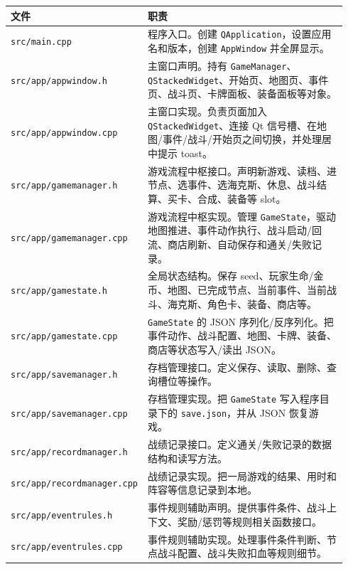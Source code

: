 \documentclass[UTF8,10pt]{ctexart}
\begin{document}
{\small
\begin{longtable}{p{0.34\linewidth}p{0.60\linewidth}}
\toprule
\textbf{文件} & \textbf{职责} \\
\midrule
\texttt{src/\allowbreak{}main.\allowbreak{}cpp} & 程序入口。创建 \texttt{QApplication}，设置应用名和版本，创建 \texttt{AppWindow} 并全屏显示。 \\
\texttt{src/\allowbreak{}app/\allowbreak{}appwindow.\allowbreak{}h} & 主窗口声明。持有 \texttt{GameManager}、\texttt{QStackedWidget}、开始页、地图页、事件页、战斗页、卡牌面板、装备面板等对象。 \\
\texttt{src/\allowbreak{}app/\allowbreak{}appwindow.\allowbreak{}cpp} & 主窗口实现。负责页面加入 \texttt{QStackedWidget}、连接 Qt 信号槽、在地图/事件/战斗/开始页之间切换，并处理居中提示 toast。 \\
\texttt{src/\allowbreak{}app/\allowbreak{}gamemanager.\allowbreak{}h} & 游戏流程中枢接口。声明新游戏、读档、进节点、选事件、选海克斯、休息、战斗结算、买卡、合成、装备等 slot。 \\
\texttt{src/\allowbreak{}app/\allowbreak{}gamemanager.\allowbreak{}cpp} & 游戏流程中枢实现。管理 \texttt{GameState}，驱动地图推进、事件动作执行、战斗启动/回流、商店刷新、自动保存和通关/失败记录。 \\
\texttt{src/\allowbreak{}app/\allowbreak{}gamestate.\allowbreak{}h} & 全局状态结构。保存 seed、玩家生命/金币、地图、已完成节点、当前事件、当前战斗、海克斯、角色卡、装备、商店等。 \\
\texttt{src/\allowbreak{}app/\allowbreak{}gamestate.\allowbreak{}cpp} & \texttt{GameState} 的 JSON 序列化/反序列化。把事件动作、战斗配置、地图、卡牌、装备、商店等状态写入/读出 JSON。 \\
\texttt{src/\allowbreak{}app/\allowbreak{}savemanager.\allowbreak{}h} & 存档管理接口。定义保存、读取、删除、查询槽位等操作。 \\
\texttt{src/\allowbreak{}app/\allowbreak{}savemanager.\allowbreak{}cpp} & 存档管理实现。把 \texttt{GameState} 写入程序目录下的 \texttt{save.\allowbreak{}json}，并从 JSON 恢复游戏。 \\
\texttt{src/\allowbreak{}app/\allowbreak{}recordmanager.\allowbreak{}h} & 战绩记录接口。定义通关/失败记录的数据结构和读写方法。 \\
\texttt{src/\allowbreak{}app/\allowbreak{}recordmanager.\allowbreak{}cpp} & 战绩记录实现。把一局游戏的结果、用时和阵容等信息记录到本地。 \\
\texttt{src/\allowbreak{}app/\allowbreak{}eventrules.\allowbreak{}h} & 事件规则辅助声明。提供事件条件、战斗上下文、奖励/惩罚等规则相关函数接口。 \\
\texttt{src/\allowbreak{}app/\allowbreak{}eventrules.\allowbreak{}cpp} & 事件规则辅助实现。处理事件条件判断、节点战斗配置、战斗失败扣血等规则细节。 \\
\bottomrule
\end{longtable}
}
\end{document}
